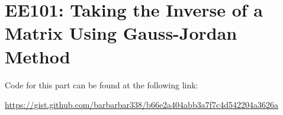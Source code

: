\chapter{EE101: Taking the Inverse of a Matrix Using Gauss-Jordan Method}

Code for this part can be found at the following link:

\bigbreak

\noindent\url{https://gist.github.com/barbarbar338/b66e2a404abb3a7f7c4d542204a3626a}
